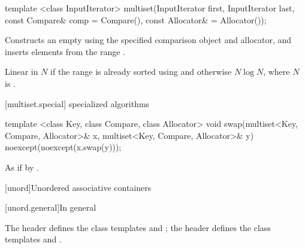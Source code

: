 %
\begin{itemdecl}
template <class InputIterator>
  multiset(InputIterator first, InputIterator last,
           const Compare& comp = Compare(), const Allocator& = Allocator());
\end{itemdecl}

\begin{itemdescr}
\pnum
\effects
Constructs an empty
using the specified comparison object and allocator,
and inserts elements from the range
.

\pnum
\complexity
Linear in $N$
if the range
is already sorted using  and otherwise $N \log{N}$,
where $N$ is
.
\end{itemdescr}

[multiset.special]{ specialized algorithms}

%
%
\begin{itemdecl}
template <class Key, class Compare, class Allocator>
  void swap(multiset<Key, Compare, Allocator>& x,
            multiset<Key, Compare, Allocator>& y)
    noexcept(noexcept(x.swap(y)));
\end{itemdecl}

\begin{itemdescr}
\pnum
\effects
As if by .
\end{itemdescr}

[unord]{Unordered associative containers}

[unord.general]{In general}

\pnum
The header  defines the class templates
 and
; the header  defines the class templates
 and .

